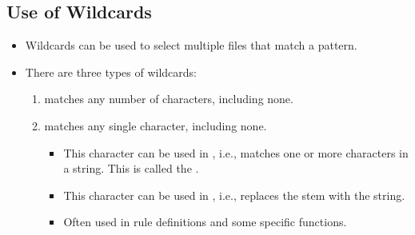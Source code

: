 \subsection{Use of Wildcards}

\begin{itemize}
    \item Wildcards can be used to select multiple files that match a pattern.
    \item There are three types of wildcards:
    \begin{enumerate}
        \item \quoted{*} matches any number of characters, including none.
        \item \quoted{\%} matches any single character, including none.
        \begin{itemize}
            \item This character can be used in , i.e., matches one or more
            characters in a string. This is called the .
            \item This character can be used in , i.e., replaces the stem
            with the  string.
            \item Often used in rule definitions and some specific functions.
        \end{itemize}
    \end{enumerate}
\end{itemize}

